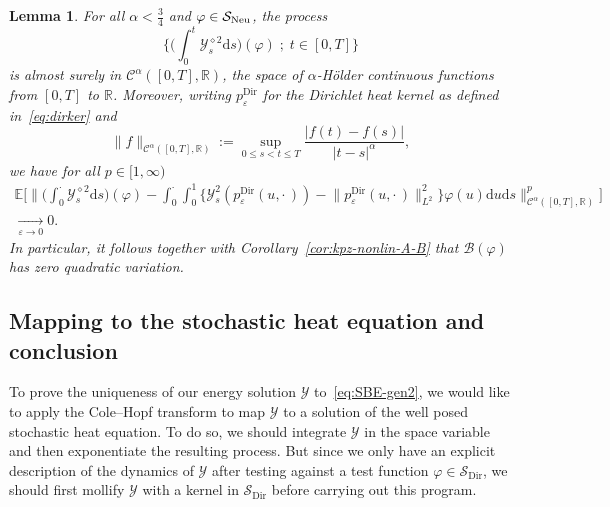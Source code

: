 \documentclass[10pt]{amsart}
\newtheorem{lemm}[theo]{Lemma}\newtheorem{prop}[theo]{Proposition}\newtheorem{coro}[theo]{Corollary}\newtheorem{conj}[theo]{Conjecture}
\theoremstyle{definition}\newtheorem{defi}[theo]{Definition}\newtheorem{rema}[theo]{Remark}\newtheorem{exam}[theo]{Example}\newtheorem{exem}[theo]{Example}\newtheorem{nota}[theo]{Notation}
\DeclareMathOperator{\Dir}{Dir}
\newcommand{\bb}[1]{{\mathbb #1}}
\newcommand{\mc}[1]{{\mathcal #1}}
\renewcommand{\mc}[1]{{\mathcal #1}}
\newcommand{\SD}{\ensuremath{\mc S_{\Dir}}}
\renewcommand{\le}{\leqslant}
\newcommand*{\dd}{\mathrm{d}}
\newcommand*{\ds}{\dd s}
\newcommand*{\du}{\dd u}
\begin{document}
\begin{lemm}\label{lem:kpz-nonlin-conv}
For all $\alpha < \frac34$ and $\varphi
\in \mc S_{\rm{Neu}}$, the process
\[
\bigg\{\bigg(\int_0^t \mc Y_s^{\diamond 2} \ds \bigg)(\varphi) \; ; \; t \in [0, T]\bigg\}
\]
is almost surely in $\mc C^{\alpha} ([0, T], \mathbb{R})$, the space of $\alpha$-H\"older continuous functions from $[0,T]$ to $\bb R$. Moreover, writing $p^{\Dir}_\varepsilon$ for the Dirichlet heat kernel as defined in~\eqref{eq:dirker} and
\[
\| f \|_{\mc C^{\alpha} ([0, T],\mathbb{R})} := \sup_{0 \le s < t \le T} \frac{|f(t)-f(s)|}{|t-s|^\alpha},
\]
we have for all $p \in [1, \infty)$
\begin{align*}
\mathbb{E} \bigg[\bigg\|
\bigg(\int_0^{\cdot} \mc Y_s^{\diamond 2} \ds\bigg) (\varphi) - \int_0^{\cdot}
\int_0^1 \Big\{ \mc Y^2_s \left(p^{\Dir}_{\varepsilon} (u, \cdot\,)
\right) - \big\| p^{\Dir}_{\varepsilon} (u, \cdot\,) \big\|_{L^2}^2 \Big\} \varphi (u) \du \ds \bigg\|_{\mc C^{\alpha} ([0, T],
\mathbb{R})}^p \bigg] \\ \xrightarrow[\varepsilon \to 0]{} 0.
\end{align*}
In particular, it follows together with Corollary~\ref{cor:kpz-nonlin-A-B} that $\mc B(\varphi)$ has zero quadratic variation.
\end{lemm}



\subsection{Mapping to the stochastic heat equation and conclusion}\label{ssec:map}

To prove the uniqueness of our energy solution $\mc Y$ to~\eqref{eq:SBE-gen2}, we would like to apply the Cole--Hopf transform to map $\mc Y$ to a solution of the well posed stochastic heat equation. To do so, we should integrate $\mc Y$ in the space variable and then exponentiate the resulting process. But since we only have an explicit description of the dynamics of $\mc Y$ after testing against a test function $\varphi \in \SD$, we should first mollify $\mc Y$ with a kernel in $\SD$ before carrying out this program.
\end{document}
